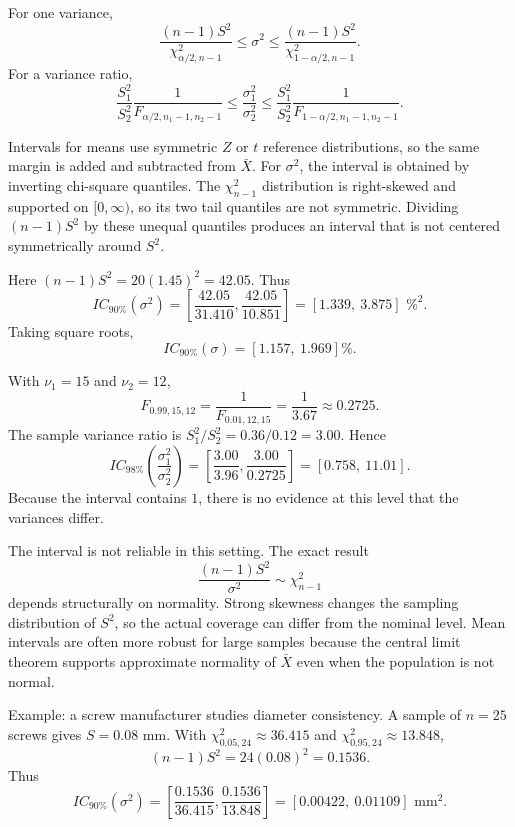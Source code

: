 \begin{solproblema}[prob:05ea7a1]
For one variance,
\[
	\frac{(n-1)S^2}{\chi^2_{\alpha/2,n-1}}
	\le\sigma^2\le
	\frac{(n-1)S^2}{\chi^2_{1-\alpha/2,n-1}}.
\]
For a variance ratio,
\[
	\frac{S_1^2}{S_2^2}\frac{1}{F_{\alpha/2,n_1-1,n_2-1}}
	\le
	\frac{\sigma_1^2}{\sigma_2^2}
	\le
	\frac{S_1^2}{S_2^2}\frac{1}{F_{1-\alpha/2,n_1-1,n_2-1}}.
\]
\end{solproblema}

\begin{solproblema}[prob:c70c188]
Intervals for means use symmetric $Z$ or $t$ reference distributions, so the same margin is added and subtracted from $\bar X$. For $\sigma^2$, the interval is obtained by inverting chi-square quantiles. The $\chi^2_{n-1}$ distribution is right-skewed and supported on $[0,\infty)$, so its two tail quantiles are not symmetric. Dividing $(n-1)S^2$ by these unequal quantiles produces an interval that is not centered symmetrically around $S^2$.
\end{solproblema}

\begin{solproblema}[prob:fa97dc8]
Here $(n-1)S^2=20(1.45)^2=42.05$. Thus
\[
	IC_{90\%}(\sigma^2)=\left[\frac{42.05}{31.410},\frac{42.05}{10.851}\right]
	=[1.339,\ 3.875]\text{ \%}^2.
\]
Taking square roots,
\[
	IC_{90\%}(\sigma)=[1.157,\ 1.969]\%.
\]
\end{solproblema}

\begin{solproblema}[prob:33162ae]
With $\nu_1=15$ and $\nu_2=12$,
\[
	F_{0.99,15,12}=\frac1{F_{0.01,12,15}}=\frac1{3.67}\approx0.2725.
\]
The sample variance ratio is $S_1^2/S_2^2=0.36/0.12=3.00$. Hence
\[
	IC_{98\%}\left(\frac{\sigma_1^2}{\sigma_2^2}\right)
	=\left[\frac{3.00}{3.96},\frac{3.00}{0.2725}\right]
	=[0.758,\ 11.01].
\]
Because the interval contains $1$, there is no evidence at this level that the variances differ.
\end{solproblema}

\begin{solproblema}
The interval is not reliable in this setting. The exact result
\[
	\frac{(n-1)S^2}{\sigma^2}\sim\chi^2_{n-1}
\]
depends structurally on normality. Strong skewness changes the sampling distribution of $S^2$, so the actual coverage can differ from the nominal level. Mean intervals are often more robust for large samples because the central limit theorem supports approximate normality of $\bar X$ even when the population is not normal.
\end{solproblema}

\begin{solproblema}[prob:866061e]
Example: a screw manufacturer studies diameter consistency. A sample of $n=25$ screws gives $S=0.08$ mm. With $\chi^2_{0.05,24}\approx36.415$ and $\chi^2_{0.95,24}\approx13.848$,
\[
	(n-1)S^2=24(0.08)^2=0.1536.
\]
Thus
\[
	IC_{90\%}(\sigma^2)=\left[\frac{0.1536}{36.415},\frac{0.1536}{13.848}\right]
	=[0.00422,\ 0.01109]\text{ mm}^2.
\]
\end{solproblema}
